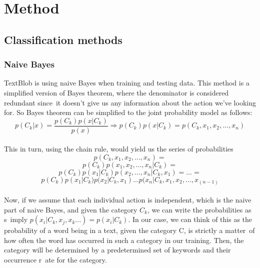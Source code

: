 \documentclass[a4paper]{article}
\begin{document}
 



\section*{Method}  
\subsection{Classification methods}
\subsubsection{Naive Bayes}
TextBlob is using naive Bayes when training and testing data. This method is a simplified version of Bayes theorem, where the denominator is considered redundant since\
 it doesn't give us any information about the action we've looking for. So Bayes theorem can be simplified to the joint probability model as follows:
\\\[p(C_k|x) = \frac{p(C_k)p(x|C_k)}{p(x)} \Longrightarrow p(C_k)p(x|C_k) = p(C_k,x_1,x_2,...,x_n)\]\\
This in turn, using the chain rule, would yield us the series of probabilities \[p(C_k,x_1,x_2,...,x_n) = \]
\[p(C_k)p(x_1,x_2,...,x_n|C_k) =\]
\[p(C_k)p(x_1|C_k)p(x_2,...,x_n|C_k, x_1) = ... =\]
\[p(C_k)p(x_1|C_k)p(x_2|C_k, x_1) ... p(x_n|C_k, x_1, x_2,...,x_(n-1) \]\\
Now, if we assume that each individual action is independent, which is the naive part of naive Bayes, and given the category $C_k$, we can write the probabilities as s\
imply $p(x_i|C_k, x_j,x_k...) = p(x_i|C_k)$. In our case, we can think of this as the probability of a word being in a text, given the category C, is strictly a matter\
 of how often the word has occurred in such a category in our training. Then, the category will be determined by a predetermined set of keywords and their occurrence r\
ate for the category.
\end{document}
